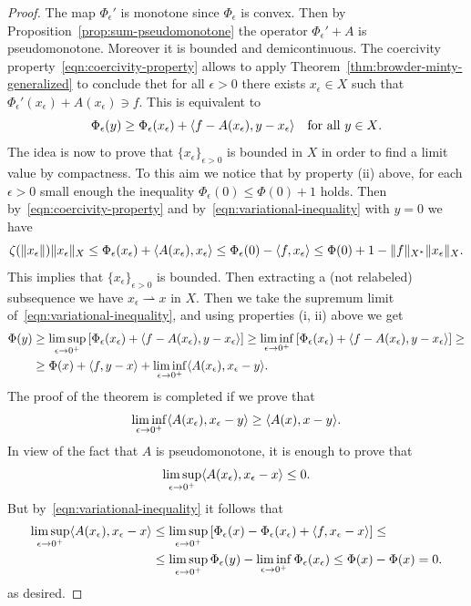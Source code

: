 \documentclass[a4paper,10pt,twoside]{amsbook}
\numberwithin{section}{chapter}
\numberwithin{equation}{chapter}
\theoremstyle{definition}
\DeclarePairedDelimiter{\norm}{\lVert}{\rVert}
\DeclarePairedDelimiter{\dual}{\langle}{\rangle}
\begin{document}
\begin{proof}
The map $\Phi_\epsilon'$ is monotone since $\Phi_\epsilon$ is convex. Then by Proposition~\ref{prop:sum-pseudomonotone} the operator $\Phi_\epsilon'+A$ is pseudomonotone. Moreover it is bounded and demicontinuous. The coercivity property~\eqref{eqn:coercivity-property} allows to apply Theorem~\ref{thm:browder-minty-generalized} to conclude thet for all $\epsilon>0$ there exists $x_\epsilon\in X$ such that $\Phi_\epsilon'(x_\epsilon)+A(x_\epsilon)\ni f$. This is equivalent to
\begin{equation}
\label{eqn:variational-inequality}
\Phi_\epsilon(y)\ge\Phi_\epsilon(x_\epsilon)+\dual{f-A(x_\epsilon),y-x_\epsilon}\quad\text{for all $y\in X$}.
\end{equation}
The idea is now to prove that $\{x_\epsilon\}_{\epsilon>0}$ is bounded in $X$ in order to find a limit value by compactness. To this aim we notice that by property (ii) above, for each $\epsilon>0$ small enough the inequality $\Phi_\epsilon(0)\le\Phi(0)+1$ holds. Then by~\eqref{eqn:coercivity-property} and by~\eqref{eqn:variational-inequality} with $y=0$ we have
\[
\zeta(\norm{x_\epsilon})\norm{x_\epsilon}_X\le \Phi_\epsilon(x_\epsilon)+\dual{A(x_\epsilon),x_\epsilon}\le\Phi_\epsilon(0)-\dual{f,x_\epsilon}\le\Phi(0)+1-\norm{f}_{X^*}\norm{x_\epsilon}_X.
\]
This implies that $\{x_\epsilon\}_{\epsilon>0}$ is bounded. Then extracting a (not relabeled) subsequence we have $x_\epsilon\rightharpoonup x$ in $X$. Then we take the supremum limit of~\eqref{eqn:variational-inequality}, and using properties (i, ii) above we get
\[
\begin{split}
\Phi(y)&\ge\limsup_{\epsilon\to 0^+}\left[\Phi_\epsilon(x_\epsilon)+\dual{f-A(x_\epsilon),y-x_\epsilon}\right]\ge\liminf_{\epsilon\to 0^+}\left[\Phi_\epsilon(x_\epsilon)+\dual{f-A(x_\epsilon),y-x_\epsilon}\right]\ge\\
&\ge\Phi(x)+\dual{f,y-x}+\liminf_{\epsilon\to 0^+}\dual{A(x_\epsilon),x_\epsilon-y}.
\end{split}
\]
The proof of the theorem is completed if we prove that
\[
\liminf_{\epsilon\to 0^+}\dual{A(x_\epsilon),x_\epsilon-y}\ge\dual{A(x),x-y}.
\]
In view of the fact that $A$ is pseudomonotone, it is enough to prove that
\[
\limsup_{\epsilon\to 0^+}\dual{A(x_\epsilon),x_\epsilon-x}\le0.
\]
But by~\eqref{eqn:variational-inequality} it follows that
\[
\begin{split}
\limsup_{\epsilon\to 0^+}\dual{A(x_\epsilon),x_\epsilon-x}&\le\limsup_{\epsilon\to 0^+}\left[\Phi_\epsilon(x)-\Phi_\epsilon(x_\epsilon)+\dual{f,x_\epsilon-x}\right]\le\\
&\le\limsup_{\epsilon\to0^+}\Phi_\epsilon(y)-\liminf_{\epsilon\to0^+}\Phi_\epsilon(x_\epsilon)\le\Phi(x)-\Phi(x)=0.
\end{split}
\]
as desired.
\end{proof}
\end{document}

